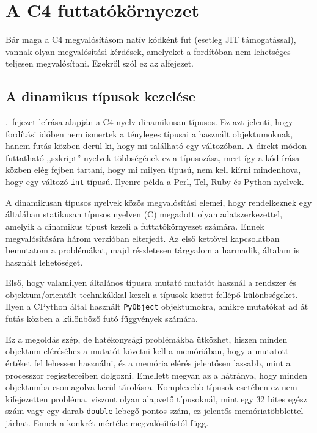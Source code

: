 \section{A C4 futtatókörnyezet}\label{sec:c4:rt}

Bár maga a C4 megvalósításom natív kódként fut (esetleg \gls{JIT} támogatással), vannak olyan megvalósítási kérdések, amelyeket a fordítóban nem lehetséges teljesen megvalósítani.
Ezekről szól ez az alfejezet.

\subsection{A dinamikus típusok kezelése}\label{subsec:c4:rt:types}

.~fejezet leírása alapján a C4 nyelv dinamikusan típusos.
Ez azt jelenti, hogy fordítási időben nem ismertek a tényleges típusai a használt objektumoknak, hanem futás közben derül ki, hogy mi található egy változóban.
A direkt módon futtatható ,,szkript'' nyelvek többségének ez a típusozása, mert így a kód írása közben elég fejben tartani, hogy mi milyen típusú, nem kell kiírni mindenhova, hogy egy változó {\tt int} típusú.
Ilyenre példa a Perl, Tcl, Ruby és Python nyelvek.

A dinamikusan típusos nyelvek közös megvalósítási elemei, hogy rendelkeznek egy általában statikusan típusos nyelven (\pl C) megadott olyan adatszerkezettel, amelyik a dinamikus típust kezeli a futtatókörnyezet számára.
Ennek megvalósítására három verzióban elterjedt.
Az első kettővel kapcsolatban bemutatom a problémákat, majd részletesen tárgyalom a harmadik, általam is használt lehetőséget.

Első, hogy valamilyen általános típusra mutató mutatót használ a rendszer és objektum\-/orientált technikákkal kezeli a típusok között fellépő különbségeket.
Ilyen a CPython által használt {\tt PyObject} objektumokra, amikre mutatókat ad át futás közben a különböző futó függvények számára.

Ez a megoldás szép, de hatékonysági problémákba ütközhet, hiszen minden objektum eléréséhez a mutatót követni kell a memóriában, hogy a mutatott értéket fel lehessen használni, és a memória elérés jelentősen lassabb, mint a processzor regisztereiben dolgozni.
Emellett megvan az a hátránya, hogy minden objektumba csomagolva kerül tárolásra.
Komplexebb típusok esetében ez nem kifejezetten probléma, viszont olyan alapvető típusoknál, mint egy 32 bites egész szám vagy egy darab {\tt double} lebegő pontos szám, ez jelentős memóriatöbblettel járhat.
Ennek a konkrét mértéke megvalósítástól függ.

